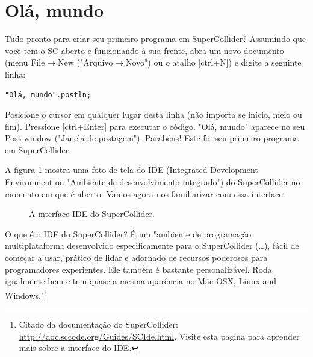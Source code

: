 
\section{Olá, mundo}

Tudo pronto para criar seu primeiro programa em SuperCollider? Assumindo que você tem o SC aberto e funcionando à sua frente, abra um novo documento (menu File$\rightarrow$New ("Arquivo$\rightarrow$Novo") ou o atalho [ctrl+N]) e digite a seguinte linha:

 
\begin{lstlisting}[style=SuperCollider-IDE, basicstyle=\scttfamily\footnotesize ]
"Olá, mundo".postln;
\end{lstlisting}
 
Posicione o cursor em qualquer lugar desta linha (não importa se início, meio ou fim). Pressione [ctrl+Enter] para executar o código. "Olá, mundo" aparece no seu Post window ("Janela de postagem"). Parabéns! Este foi seu primeiro programa em SuperCollider.

 
\bigskip
{}
\bigskip
 

A figura \ref{fig:scidegui} mostra uma foto de tela do IDE (Integrated Development Environment ou "Ambiente de desenvolvimento integrado") do SuperCollider no momento em que é aberto. Vamos agora nos familiarizar com essa interface.

\begin{figure}[t]
\centerline{}
\caption{A interface IDE do SuperCollider.}
\label{fig:scidegui}
\end{figure}

O que é o IDE do SuperCollider? É um "ambiente de programação multiplataforma desenvolvido especificamente para o SuperCollider (\dots), 
fácil de começar a usar, prático de lidar e adornado de recursos poderosos para programadores experientes. Ele também é bastante personalizável. Roda igualmente bem e tem quase a mesma aparência no 
Mac OSX, Linux and Windows."\footnote{Citado da documentação do SuperCollider: \url{http://doc.sccode.org/Guides/SCIde.html}. Visite esta página para aprender mais sobre a interface do IDE.}

